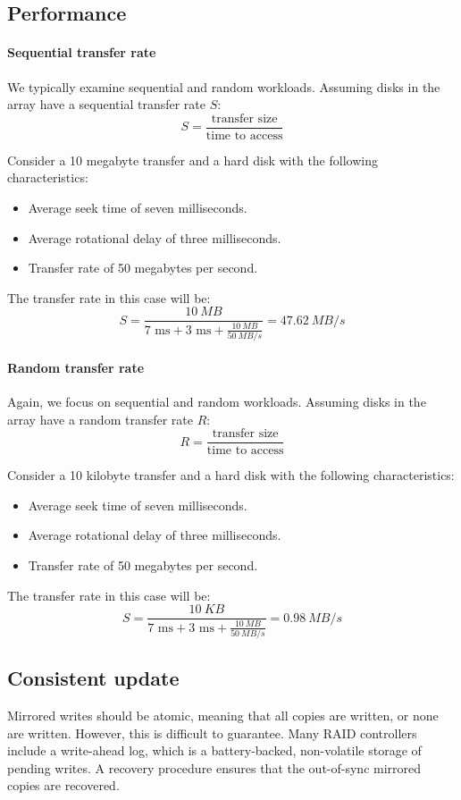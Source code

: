 \subsection{Performance}
\paragraph*{Sequential transfer rate}
We typically examine sequential and random workloads. 
Assuming disks in the array have a sequential transfer rate $S$:
\[S=\dfrac{\text{transfer size}}{\text{time to access}}\]
\begin{example}
    Consider a 10 megabyte transfer and a hard disk with the following characteristics:
    \begin{itemize}
        \item Average seek time of seven milliseconds.
        \item Average rotational delay of three milliseconds.
        \item Transfer rate of 50 megabytes per second.
    \end{itemize}
    The transfer rate in this case will be:
    \[S=\dfrac{10\:MB}{7\text{ ms}+3\text{ ms}+\frac{10\:MB}{50\:MB/s}}= 47.62\:MB/s\]
\end{example}

\paragraph*{Random transfer rate}
Again, we focus on sequential and random workloads. 
Assuming disks in the array have a random transfer rate $R$:
\[R=\dfrac{\text{transfer size}}{\text{time to access}}\]
\begin{example}
    Consider a 10 kilobyte transfer and a hard disk with the following characteristics:
    \begin{itemize}
        \item Average seek time of seven milliseconds.
        \item Average rotational delay of three milliseconds.
        \item Transfer rate of 50 megabytes per second.
    \end{itemize}
    The transfer rate in this case will be:
    \[S=\dfrac{10\:KB}{7\text{ ms}+3\text{ ms}+\frac{10\:MB}{50\:MB/s}}= 0.98\: MB/s\]
\end{example}

\subsection{Consistent update}
Mirrored writes should be atomic, meaning that all copies are written, or none are written.
However, this is difficult to guarantee. Many RAID controllers include a write-ahead log, which is a battery-backed, non-volatile storage of pending writes. 
A recovery procedure ensures that the out-of-sync mirrored copies are recovered.

